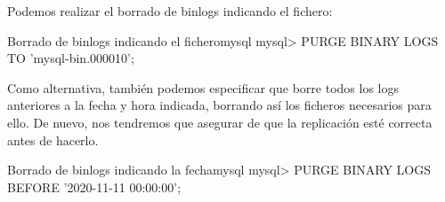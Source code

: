 
Podemos realizar el borrado de binlogs indicando el fichero:

\begin{mycode}{Borrado de binlogs indicando el fichero}{mysql}{}
mysql> PURGE BINARY LOGS TO 'mysql-bin.000010';
\end{mycode}


Como alternativa, también podemos especificar que borre todos los logs anteriores a la fecha y hora indicada, borrando así los ficheros necesarios para ello. De nuevo, nos tendremos que asegurar de que la replicación esté correcta antes de hacerlo.


\begin{mycode}{Borrado de binlogs indicando la fecha}{mysql}{}
mysql> PURGE BINARY LOGS BEFORE '2020-11-11 00:00:00';
\end{mycode}